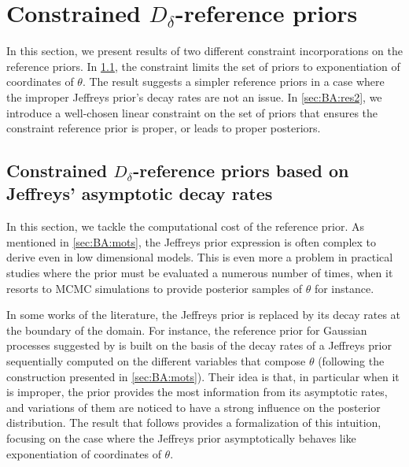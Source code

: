 \section{Constrained $D_\delta$-reference priors}\label{sec:BA:ress}


In this section, we present results of two different constraint incorporations on the reference priors.
In \cref{sec:BA:res1}, the constraint limits the set of priors to exponentiation of coordinates of $\theta$. The result suggests a simpler reference priors in a case where the improper Jeffreys prior's decay rates are not an issue.
In \cref{sec:BA:res2}, we introduce a well-chosen linear constraint on the set of priors that ensures the constraint reference prior is proper, or leads to proper posteriors.



\subsection{Constrained $D_\delta$-reference priors based on Jeffreys' asymptotic decay rates}\label{sec:BA:res1}




    


    In this section, we tackle the computational cost of the reference prior. As mentioned in \cref{sec:BA:mots}, the Jeffreys prior expression is often complex to derive even in low dimensional models. This is even more a problem in practical studies where the prior must be evaluated a numerous number of times, when it resorts to MCMC simulations to provide posterior samples of $\theta$ for instance.

    In some works of the literature, the Jeffreys prior is replaced by its decay rates at the boundary of the domain. For instance, the reference prior for Gaussian processes suggested by \citet{gu_jointly_2019} is built on the basis of the decay rates of a Jeffreys prior sequentially computed on the different variables that compose $\theta$ (following the construction presented in \cref{sec:BA:mots}).
    Their idea is that, in particular when it is improper, the prior provides the most information from its asymptotic rates, and variations of them are noticed to have a strong influence on the posterior distribution.
    The result that follows provides a formalization of this intuition, focusing on the case where the Jeffreys prior asymptotically behaves like exponentiation of coordinates of $\theta$.
    
